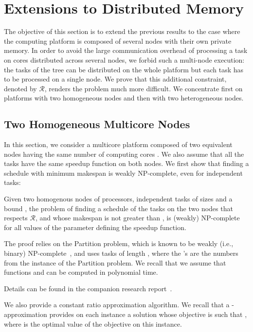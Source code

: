 \documentclass{llncs}
\newcommand{\R}{\ensuremath{\mathcal{R}}\xspace}
\newif\iflong
\begin{document}
\section{Extensions to Distributed Memory}
\label{sec:dist}

The objective of this section is to extend the previous results to the
case where the computing platform is composed of several nodes with
their own private memory. In order to avoid the large communication overhead
of processing a task on cores distributed across several
nodes, we forbid such a multi-node execution: the tasks of the tree can
be distributed on the whole platform but each task has to be processed on a
single node. We prove that this additional constraint, denoted by
\R, renders the problem much more difficult. We concentrate first
on platforms with two homogeneous nodes and then with two heterogeneous
nodes.

\subsection{Two Homogeneous Multicore Nodes}
\label{sec:dist-hom}

In this section, we consider a multicore platform composed of two
equivalent nodes having the same number of computing cores . We
also assume that all the tasks  have the same speedup function
 on both nodes.
We first show that finding a schedule with minimum makespan is weakly
NP-complete, even for independent tasks:

\begin{theorem}
  Given two homogenous nodes of  processors,  independent tasks
  of sizes  and a bound , the problem of finding a
  schedule of the  tasks on the two nodes that respects \R, and
  whose makespan is not greater than , is (weakly) NP-complete for
  all values of the  parameter defining the speedup function.
\end{theorem}

The proof relies on the Partition problem, which is known to be weakly
(i.e., binary) NP-complete~\cite{gareyjohnson}, and uses tasks of
length , where the 's are the numbers from the
instance of the Partition problem. We recall that we assume that
functions  and  can be
computed in polynomial time.  
\iflong
\todo[inline]{faire une courte preuve de
  NP-complétude}
\else
Details can be found in the companion research report~\cite{RR-ipdps-2014}.
\fi

We also provide a constant ratio approximation algorithm. We recall
that a -approximation provides on each instance a solution whose
objective  is such that , where  is the optimal
value of the objective on this instance.
\end{document}
